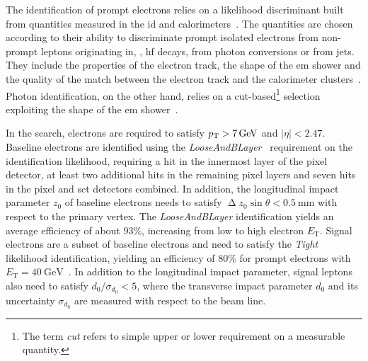 The identification of prompt electrons relies on a likelihood discriminant built from quantities measured in the \gls{id} and calorimeters~\cite{PERF-2017-01}.
The quantities are chosen according to their ability to discriminate prompt isolated electrons from non-prompt leptons originating in, \eg, \gls{hf} decays, from photon conversions or from jets.
They include the properties of the electron track, the shape of the \gls{em} shower and the quality of the match between the electron track and the calorimeter clusters~\cite{PERF-2017-01}.
Photon identification, on the other hand, relies on a cut-based\footnote{The term \textit{cut} refers to simple upper or lower requirement on a measurable quantity.} selection exploiting the shape of the \gls{em} shower~\cite{EGAM-2018-01}.

In the \onelepton search, electrons are required to satisfy $p_{\mathrm{T}} > \SI{7}{GeV}$ and $\vert\eta\vert<2.47$.
Baseline electrons are identified using the \textit{LooseAndBLayer}~\cite{PERF-2017-01} requirement on the identification likelihood, requiring a hit in the innermost layer of the pixel detector, at least two additional hits in the remaining pixel layers and seven hits in the pixel and \gls{sct} detectors combined.
In addition, the longitudinal impact parameter $z_0$ of baseline electrons needs to satisfy $\upDelta z_0\sin\theta < \SI{0.5}{\milli\meter}$ with respect to the primary vertex.
The \textit{LooseAndBLayer} identification yields an average efficiency of about 93\%, increasing from low to high electron $E_\mathrm{T}$.
Signal electrons are a subset of baseline electrons and need to satisfy the \textit{Tight}~\cite{PERF-2017-01} likelihood identification, yielding an efficiency of 80\% for prompt electrons with $E_\mathrm{T}=\SI{40}{\GeV}$~\cite{PERF-2017-01}.
In addition to the longitudinal impact parameter, signal leptons also need to satisfy $d_0/\sigma_{d_0} < 5$, where the transverse impact parameter $d_0$ and its uncertainty $\sigma_{d_0}$ are measured with respect to the beam line. 

